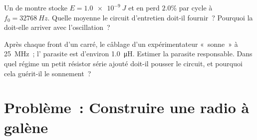 \begin{exercise}[$\star\star\star$]\label{exo:g12:rlc-oscillations:14}
Un  de montre stocke
$E = \qty{1.0e-9}{J}$ et en perd $2.0\%$ par cycle à
$f_0 = \qty{32768}{Hz}$. Quelle  moyenne le
circuit d'entretien doit-il fournir~? Pourquoi la  doit-elle
arriver  avec l'oscillation~?
\end{exercise}

\begin{exercise}[$\star\star\star$]\label{exo:g12:rlc-oscillations:15}
Après chaque front d'un  carré, le câblage d'un
expérimentateur «~sonne~» à \qty{25}{MHz}~; l'
parasite est d'environ \qty{1.0}{\micro H}. Estimer la
 parasite responsable. Dans quel régime un
petit résistor série ajouté doit-il pousser le circuit, et pourquoi
cela guérit-il le sonnement~?
\end{exercise}

\section{Problème~: Construire une radio à galène}

